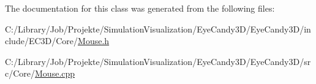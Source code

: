 The documentation for this class was generated from the following files\+:\begin{DoxyCompactItemize}
\item 
C\+:/\+Library/\+Job/\+Projekte/\+Simulation\+Visualization/\+Eye\+Candy3\+D/\+Eye\+Candy3\+D/include/\+E\+C3\+D/\+Core/\mbox{\hyperlink{_mouse_8h}{Mouse.\+h}}\item 
C\+:/\+Library/\+Job/\+Projekte/\+Simulation\+Visualization/\+Eye\+Candy3\+D/\+Eye\+Candy3\+D/src/\+Core/\mbox{\hyperlink{_mouse_8cpp}{Mouse.\+cpp}}\end{DoxyCompactItemize}
